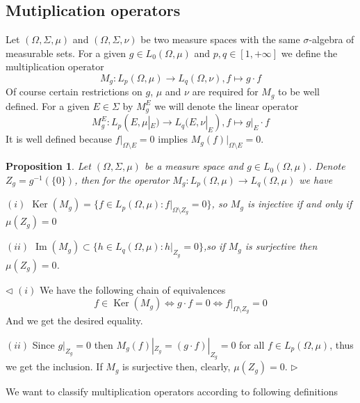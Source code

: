 \documentclass[12pt]{article}
\newtheorem{proposition}[theorem]{Proposition}
\newenvironment{proof}{\par $\triangleleft$}{$\triangleright$}
\begin{document}

\subsection{Mutiplication operators}

Let $(\Omega,\Sigma,\mu)$ and $(\Omega,\Sigma,\nu)$ be two measure spaces with
the same $\sigma$-algebra of measurable sets. For a given $g\in L_0(\Omega,\mu)$
and $p,q\in[1,+\infty]$ we define the multiplication operator
$$
    M_g:L_p(\Omega,\mu)\to L_q(\Omega,\nu), f\mapsto g\cdot f
$$
Of course certain restrictions on $g$, $\mu$ and $\nu$ are required for $M_g$ to
be well defined. For a given $E\in\Sigma$ by $M_g^E$ we will denote the linear
operator
$$
    M_g^E:L_p(E,\mu|_E)\to L_q(E,\nu|_E),f\mapsto g|_E\cdot f
$$
It is well defined because $f|_{\Omega\setminus E}=0$ implies
$M_g(f)|_{\Omega\setminus E}=0$.

\begin{proposition}\label{MultpOpSurjInjDesc} Let $(\Omega,\Sigma,\mu)$ be a
    measure space and $g\in L_0(\Omega,\mu)$. Denote $Z_g=g^{-1}( \{0 \})$,
    then for the operator $M_g:L_p(\Omega,\mu)\to L_q(\Omega,\mu)$ we have

    $(i)$ $\operatorname{Ker}(M_g)= \{f\in L_p(\Omega,\mu):f|_{\Omega\setminus
        {Z_g}}=0 \}$, so $M_g$ is injective if and only if $\mu(Z_g)=0$

    $(ii)$ $\operatorname{Im}(M_g)\subset \{h\in L_q(\Omega,\mu): h|_{Z_g}=0
        \}$,so if $M_g$ is surjective then $\mu(Z_g)=0$.

\end{proposition}
\begin{proof}
    $(i)$ We have the following chain of equivalences
    $$
        f\in\operatorname{Ker}(M_g)
        \Longleftrightarrow g\cdot f=0
        \Longleftrightarrow f|_{\Omega\setminus Z_g}=0
    $$
    And we get the desired equality.

    $(ii)$ Since $g|_{Z_g}=0$ then $M_g(f)|_{Z_g}=(g\cdot f)|_{Z_g}=0$ for all
    $f\in L_p(\Omega,\mu)$, thus we get the inclusion. If $M_g$ is surjective
    then, clearly,  $\mu(Z_g)=0$.
\end{proof}


We want to classify multiplication operators according to following definitions
\end{document}
